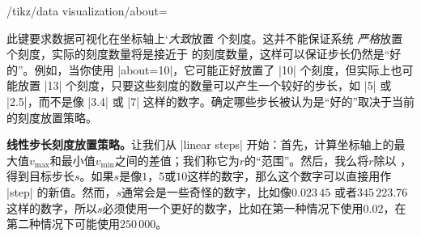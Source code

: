 \begin{key}{/tikz/data visualization/about=} %

    此键要求数据可视化在坐标轴上`\emph{大致}放置  个刻度。这并不能保证系统 \emph{严格}放置  个刻度，实际的刻度数量将是接近于  的刻度数量，这样可以保证步长仍然是``好的''。例如，当你使用 |about=10|，它可能正好放置了 |10| 个刻度，但实际上也可能放置 |13| 个刻度，只要这些刻度的数量可以产生一个较好的步长，如 |5| 或 |2.5|，而不是像 |3.4| 或 |7| 这样的数字。确定哪些步长被认为是``好的''取决于当前的刻度放置策略。


    \medskip

    \textbf{线性步长刻度放置策略。}让我们从 |linear steps| 开始：首先，计算坐标轴上的最大值$v_{\max}$和最小值$v_{\min}$之间的差值；我们称它为$r$的``范围''。然后，我么将$r$除以 ，得到目标步长$s$。如果$s$是像$1$，$5$或$10$这样的数字，那么这个数字可以直接用作 |step| 的新值。然而，$s$通常会是一些奇怪的数字，比如像$0.023\,45$ 或者$345\,223.76$这样的数字，所以$s$必须使用一个更好的数字，比如在第一种情况下使用$0.02$，在第二种情况下可能使用$250\,000$。



\end{key}

